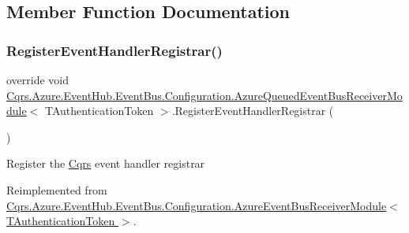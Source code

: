 \subsection{Member Function Documentation}
\mbox{\label{classCqrs_1_1Azure_1_1EventHub_1_1EventBus_1_1Configuration_1_1AzureQueuedEventBusReceiverModule_a419dbe60e08be1bbf29b875cb1f121d0_a419dbe60e08be1bbf29b875cb1f121d0}} 
\subsubsection{\texorpdfstring{Register\+Event\+Handler\+Registrar()}{RegisterEventHandlerRegistrar()}}
{\footnotesize\ttfamily override void \hyperlink{classCqrs_1_1Azure_1_1EventHub_1_1EventBus_1_1Configuration_1_1AzureQueuedEventBusReceiverModule}{Cqrs.\+Azure.\+Event\+Hub.\+Event\+Bus.\+Configuration.\+Azure\+Queued\+Event\+Bus\+Receiver\+Module}$<$ T\+Authentication\+Token $>$.Register\+Event\+Handler\+Registrar (\begin{DoxyParamCaption}{ }\end{DoxyParamCaption})\hspace{0.3cm}{\ttfamily [virtual]}}



Register the \hyperlink{namespaceCqrs}{Cqrs} event handler registrar 



Reimplemented from \hyperlink{classCqrs_1_1Azure_1_1EventHub_1_1EventBus_1_1Configuration_1_1AzureEventBusReceiverModule_ad170174fa51db720544ead9fcd74ecea_ad170174fa51db720544ead9fcd74ecea}{Cqrs.\+Azure.\+Event\+Hub.\+Event\+Bus.\+Configuration.\+Azure\+Event\+Bus\+Receiver\+Module$<$ T\+Authentication\+Token $>$}.

